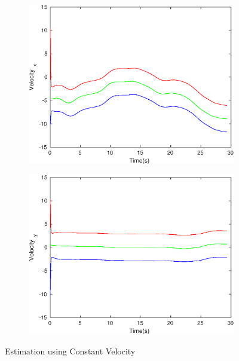\begin{figure}[!h]
\begin{subfigure}{.5\linewidth}
\end{subfigure}
\begin{subfigure}{.5\linewidth}
\centering
\includegraphics[width=.9\linewidth]{figures/Frad/s3cvSMVelocity_x}
\end{subfigure}
\begin{subfigure}{.5\linewidth}
\centering
\includegraphics[width=.9\linewidth]{figures/Frad/s3cvSMVelocity_y}
\end{subfigure}
\caption{Estimation using Constant Velocity}
\end{figure}

